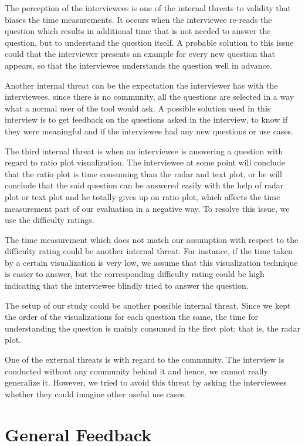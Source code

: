 The perception of the interviewees is one of the internal threats to validity that biases the time measurements. It occurs when the interviewee re-reads the question which results in additional time that is not needed to answer the question, but to understand the question itself. A probable solution to this issue could that the interviewer presents an example for every new question that appears, so that the interviewee understands the question well in advance. 

Another internal threat can be the expectation the interviewer has with the interviewees, since there is no community, all the questions are selected in a way what a normal user of the tool would ask. A possible solution used in this interview is to get feedback on the questions asked in the interview, to know if they were meaningful and if the interviewee had any new questions or use cases.

The third internal threat is when an interviewee is answering a question with regard to ratio plot visualization. The interviewee at some point will conclude that the ratio plot is time consuming than the radar and text plot, or he will conclude that the said question can be answered easily with the help of radar plot or text plot and he totally gives up on ratio plot, which affects the time measurement part of our evaluation in a negative way. To resolve this issue, we use the difficulty ratings. 

The time measurement which does not match our assumption with respect to the difficulty rating could be another internal threat. For instance, if the time taken by a certain visualization is very low, we assume that this visualization technique is easier to answer, but the corresponding difficulty rating could be high indicating that the interviewee blindly tried to answer the question.

The setup of our study could be another possible internal threat. Since we kept the order of the visualizations for each question the same, the time for understanding the question is mainly consumed in the first plot; that is, the radar plot.

One of the external threats is with regard to the community. The interview is conducted without any community behind it and hence, we cannot really generalize it. However, we tried to avoid this threat by asking the interviewees whether they could imagine other useful use cases.

\section{General Feedback}
\label{sec:4.6}

